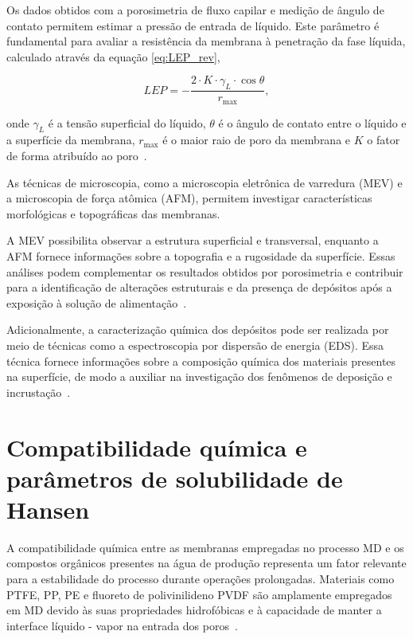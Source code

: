 Os dados obtidos com a porosimetria de fluxo capilar e medição de ângulo de contato permitem estimar a pressão de entrada de líquido. Este parâmetro é fundamental para avaliar a resistência da membrana à penetração da fase líquida, calculado através da equação \ref{eq:LEP_rev}, 

\begin{equation}
    LEP = -\frac{2 \cdot K \cdot \gamma_L \cdot \cos\theta}{r_{\max}},
    \label{eq:LEP_rev}
\end{equation}

onde $\gamma_L$ é a tensão superficial do líquido, $\theta$ é o ângulo de contato entre o líquido e a superfície da membrana, $r_{\max}$ é o maior raio de poro da membrana e $K$ o fator de forma atribuído ao poro~\cite{Park2017LEP,Eykens2016}.

As técnicas de microscopia, como a microscopia eletrônica de varredura (MEV) e a microscopia de força atômica (AFM), permitem investigar características morfológicas e topográficas das membranas. 

A MEV possibilita observar a estrutura superficial e transversal, enquanto a AFM fornece informações sobre a topografia e a rugosidade da superfície. Essas análises podem complementar os resultados obtidos por porosimetria e contribuir para a identificação de alterações estruturais e da presença de depósitos após a exposição à solução de alimentação~\cite{Alqaheem2020}.

Adicionalmente, a caracterização química dos depósitos pode ser realizada por meio de técnicas como a espectroscopia por dispersão de energia (EDS). Essa técnica fornece informações sobre a composição química dos materiais presentes na superfície, de modo a auxiliar na investigação dos fenômenos de deposição e incrustação~\cite{Alqaheem2020}.

\section{Compatibilidade química e parâmetros de solubilidade de Hansen}

A compatibilidade química entre as membranas empregadas no processo MD e os compostos orgânicos presentes na água de produção representa um fator relevante para a estabilidade do processo durante operações prolongadas. Materiais como PTFE, PP, PE e fluoreto de polivinilideno PVDF são amplamente empregados em MD devido às suas propriedades hidrofóbicas e à capacidade de manter a interface líquido - vapor na entrada dos poros~\cite{Tomczak2022}. 

